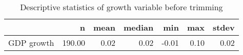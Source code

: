 \begin{table}[ht]
\centering
\begin{tabular}{rrrrrrr}
  \hline
 & n & mean & median & min & max & stdev \\ 
  \hline
GDP growth & 190.00 & 0.02 & 0.02 & -0.01 & 0.10 & 0.02 \\ 
   \hline
\end{tabular}
\caption{Descriptive statistics of growth variable before trimming} 
\label{gdpgrowth9stats}
\end{table}
